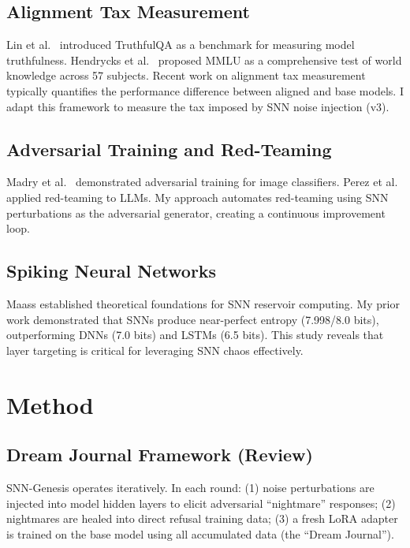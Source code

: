 \documentclass[11pt,a4paper]{article}
\begin{document}
\subsection{Alignment Tax Measurement}
Lin et al.\ \cite{lin2022truthfulqa} introduced TruthfulQA as a benchmark for measuring model truthfulness. Hendrycks et al.\ \cite{hendrycks2021mmlu} proposed MMLU as a comprehensive test of world knowledge across 57 subjects. Recent work on alignment tax measurement \cite{askell2021general} typically quantifies the performance difference between aligned and base models. I adapt this framework to measure the tax imposed by SNN noise injection (v3).

\subsection{Adversarial Training and Red-Teaming}
Madry et al.\ \cite{madry2018towards} demonstrated adversarial training for image classifiers. Perez et al.\ \cite{perez2022redteaming} applied red-teaming to LLMs. My approach automates red-teaming using SNN perturbations as the adversarial generator, creating a continuous improvement loop.

\subsection{Spiking Neural Networks}
Maass \cite{maass2002} established theoretical foundations for SNN reservoir computing. My prior work \cite{funasaki2026comprypto} demonstrated that SNNs produce near-perfect entropy (7.998/8.0 bits), outperforming DNNs (7.0 bits) and LSTMs (6.5 bits). This study reveals that layer targeting is critical for leveraging SNN chaos effectively.

\section{Method}

\subsection{Dream Journal Framework (Review)}

SNN-Genesis operates iteratively. In each round: (1) noise perturbations are injected into model hidden layers to elicit adversarial ``nightmare'' responses; (2) nightmares are healed into direct refusal training data; (3) a fresh LoRA adapter is trained on the base model using all accumulated data (the ``Dream Journal'').
\end{document}
